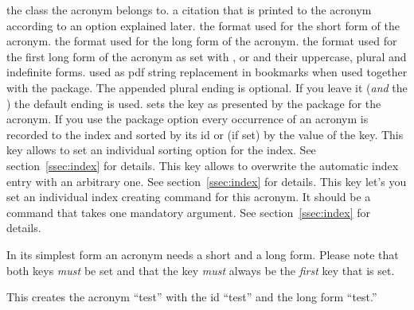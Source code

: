\documentclass[DIV10,toc=index,toc=bib,hyperfootnotes=false]{cnpkgdoc}
\makeatletter
\providecommand*\sinceversion[1]{%
  \@bsphack
  \marginnote{%
    \footnotesize\sffamily\RaggedRight
    \textcolor{black!75}{Introduced in version~#1}}%
  \@esphack}
\makeatother
\begin{document}
\begin{beschreibung}
 \newline
   the class the acronym belongs to.
 \newline
   a citation that is printed to the acronym according to an option explained later.
 \newline
   the format used for the short form of the acronym.
 \newline
   the format used for the long form of the acronym.
 \newline
   the format used for the first long form of the acronym as set with ,
    or  and their uppercase, plural and indefinite forms.
 \newline
   used as \acs{pdf} string replacement in bookmarks when used together with the
    package. The appended plural ending is optional. If you
   leave it (\emph{and} the \code{/}) the default ending is used.
 \newline
   sets the  key as presented by the  package
   for the acronym.
 \newline
   \sinceversion{1.1}If you use the package option  every occurrence
   of an acronym is recorded to the index and sorted by its \ac{id} or (if set)
   by the value of the  key. This key allows to set an individual
   sorting option for the index. See section~\ref{ssec:index} for details.
 \newline
   \sinceversion{1.1}This key allows to overwrite the automatic index entry with
   an arbitrary one. See section~\ref{ssec:index} for details.
 \newline
   \sinceversion{1.1}This key let's you set an individual index creating command
   for this acronym. It should be a command that takes one mandatory argument.
   See section~\ref{ssec:index} for details.
\end{beschreibung}

In its simplest form an acronym needs a short and a long form. Please note that
both keys \emph{must} be set and that the  key \emph{must} always be
the \emph{first} key that is set.
\begin{beispiel}
\end{beispiel}
This creates the acronym ``\acs{test}'' with the \acs{id} ``test'' and the long
form ``\acl{test}.''
\end{document}
